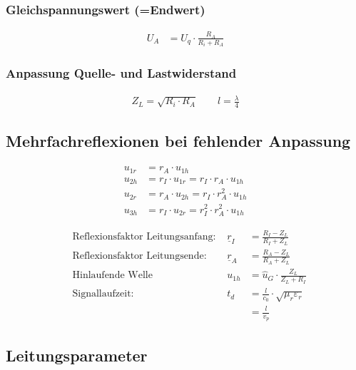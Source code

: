 \subsubsection{Gleichspannungswert (=Endwert)}
\begin{align*}
	U_A & = U_q\cdot\frac{R_A}{R_i+R_A}
\end{align*}

\subsubsection{Anpassung Quelle- und Lastwiderstand}
\begin{align*}
	Z_L = \sqrt{R_i \cdot R_A} \qquad l = \frac{\lambda}{4}
\end{align*}

\subsection{Mehrfachreflexionen bei fehlender Anpassung}

\begin{align*}
	u_{1r} & = r_A\cdot u_{1h}                                \\
	u_{2h} & = r_I\cdot u_{1r} = r_I\cdot r_A\cdot u_{1h}     \\
	u_{2r} & = r_A\cdot u_{2h} = r_I\cdot r_A^2\cdot u_{1h}   \\
	u_{3h} & = r_I\cdot u_{2r} = r_I^2\cdot r_A^2\cdot u_{1h}
\end{align*}

\begin{align*}
	 & \text{Reflexionsfaktor Leitungsanfang: } & \underline{r}_I & = \frac{R_I - Z_L}{R_I + Z_L}                 \\
	 & \text{Reflexionsfaktor Leitungsende: }   & \underline{r}_A & = \frac{R_A - Z_L}{R_A + Z_L}                 \\
	 & \text{Hinlaufende Welle}                 & u_{1h}          & = \hat{u}_G \cdot\frac{Z_L}{Z_L+R_I}          \\
	 & \text{Signallaufzeit: }                  & t_d             & = \frac{l}{c_0}\cdot\sqrt{\mu_r\varepsilon_r} \\
	 &                                          &                 & = \frac{l}{v_p}
\end{align*}

\subsection{Leitungsparameter}
